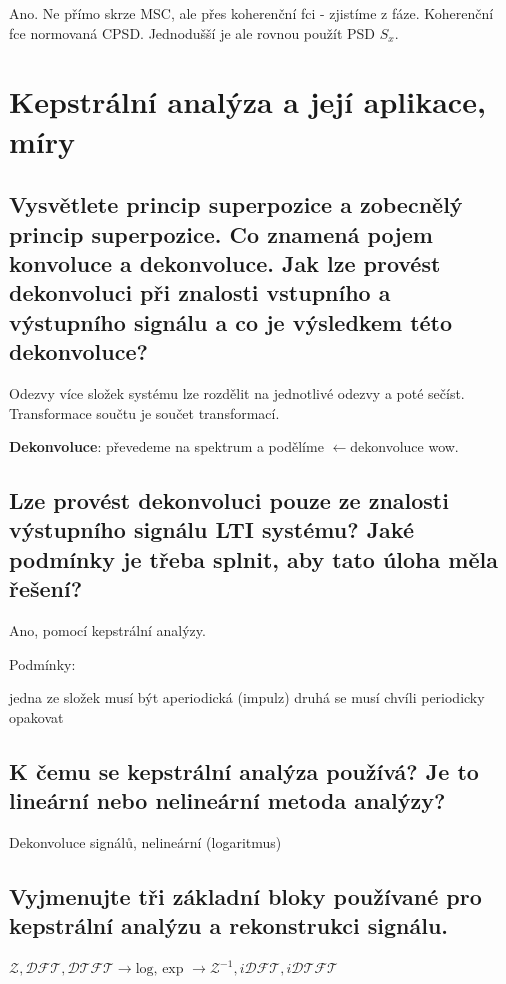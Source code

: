 \documentclass[a4paper,12pt]{article}   %
\newcommand{\llarr}{$\leftarrow$}
\newcommand{\mt}[1]{$#1$}
\begin{document}
Ano. Ne přímo skrze MSC, ale přes koherenční fci - zjistíme z fáze. Koherenční fce  normovaná CPSD. Jednodušší je ale rovnou použít PSD \mt{S_x}.


\newpage \section{Kepstrální analýza a její aplikace, míry}
\subsection{Vysvětlete princip superpozice a zobecnělý princip superpozice. Co znamená pojem konvoluce a dekonvoluce. Jak lze provést dekonvoluci při znalosti vstupního a výstupního signálu a co je výsledkem této dekonvoluce?}
Odezvy více složek systému lze rozdělit na jednotlivé odezvy a poté sečíst. Transformace součtu je součet transformací. 

\textbf{Dekonvoluce}: převedeme na spektrum a podělíme \llarr dekonvoluce wow. 


\subsection{Lze provést dekonvoluci pouze ze znalosti výstupního signálu LTI systému? Jaké podmínky je třeba splnit, aby tato úloha měla řešení?}

Ano, pomocí kepstrální analýzy.

Podmínky:
\begin{outline}
        \1 jedna ze složek musí být aperiodická (impulz)
        \1 druhá se musí chvíli periodicky opakovat
\end{outline}


\subsection{K čemu se kepstrální analýza používá? Je to lineární nebo nelineární metoda analýzy?}

Dekonvoluce signálů, nelineární (logaritmus)


\subsection{Vyjmenujte tři základní bloky používané pro kepstrální analýzu a rekonstrukci signálu.}

\mt{\mathscr{Z}, \mathscr{DFT}, \mathscr{DTFT} \rightarrow \text{log, exp }\rightarrow \mathscr{Z}^{-1}, i\mathscr{DFT}, i\mathscr{DTFT}}
\end{document}
